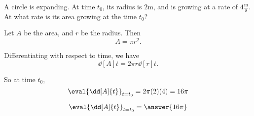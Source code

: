 \documentclass{ximera}
\author{Steven Gubkin}
\begin{document}
\begin{exercise}



A circle is expanding.  At time $t_0$, its radius is $2 \textrm{m}$,
and is growing at a rate of $4 \frac{\textrm{m}}{\textrm{s}}$.  At
what rate is its area growing at the time $t_0$?

\begin{hint}
  Let $A$ be the area, and $r$ be the radius.  Then
  \[
  A = \pi r^2.
  \]
\end{hint}

\begin{hint}
  Differentiating with respect to time, we have
  \[
  \dd[A]{t} = 2\pi r \dd[r]{t}.
  \]
\end{hint}

\begin{hint}
  So at time $t_0$,
  \[
  \eval{\dd[A]{t}}_{t = t_0} = 2 \pi (2) (4) = 16 \pi
  \]
\end{hint}

\begin{prompt}
  \[
  \eval{\dd[A]{t}}_{t = t_0} = \answer{16\pi}
  \]
\end{prompt}

\end{exercise}
\end{document}
